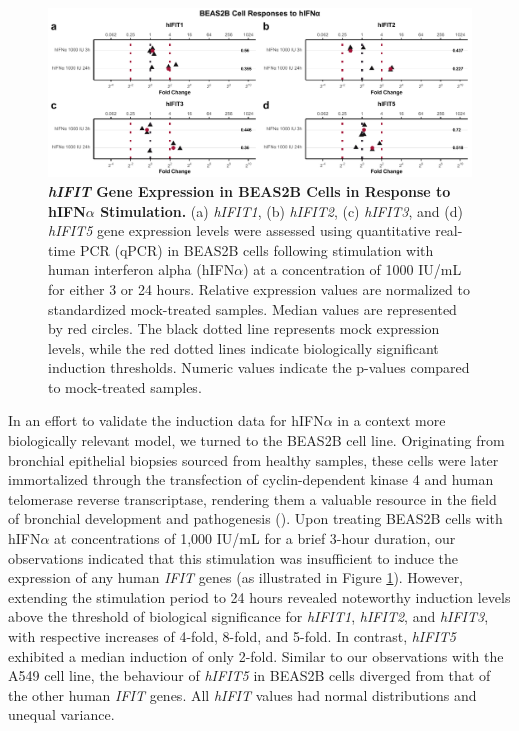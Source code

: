 \begin{figure}
    \centering
    \includegraphics[width=1\linewidth]{06. Chapter 1/Figs/01. Induction/05. beas2b_ifna.pdf}
    \caption[\textit{hIFIT} Gene Expression in BEAS2B Cells in Response to hIFN\(\alpha\) Stimulation.]{\textbf{\textit{hIFIT} Gene Expression in BEAS2B Cells in Response to hIFN\(\alpha\) Stimulation.} (a) \textit{hIFIT1}, (b) \textit{hIFIT2}, (c) \textit{hIFIT3}, and (d) \textit{hIFIT5} gene expression levels were assessed using quantitative real-time PCR (qPCR) in BEAS2B cells following stimulation with human interferon alpha (hIFN\(\alpha\)) at a concentration of 1000 IU/mL for either 3 or 24 hours. Relative expression values are normalized to standardized mock-treated samples. Median values are represented by red circles. The black dotted line represents mock expression levels, while the red dotted lines indicate biologically significant induction thresholds. Numeric values indicate the p-values compared to mock-treated samples.}
    \label{fig:BEAS2B responses to hIFNa}
\end{figure}

In an effort to validate the induction data for hIFN\(\alpha\) in a context more biologically relevant model, we turned to the BEAS2B cell line. Originating from bronchial epithelial biopsies sourced from healthy samples, these cells were later immortalized through the transfection of cyclin-dependent kinase 4 and human telomerase reverse transcriptase, rendering them a valuable resource in the field of bronchial development and pathogenesis (\cite{Ramirez2004ImmortalizationOncoproteins}). Upon treating BEAS2B cells with hIFN\(\alpha\) at concentrations of 1,000 IU/mL for a brief 3-hour duration, our observations indicated that this stimulation was insufficient to induce the expression of any human \textit{IFIT} genes (as illustrated in Figure \ref{fig:BEAS2B responses to hIFNa}). However, extending the stimulation period to 24 hours revealed noteworthy induction levels above the threshold of biological significance for \textit{hIFIT1}, \textit{hIFIT2}, and \textit{hIFIT3}, with respective increases of 4-fold, 8-fold, and 5-fold. In contrast, \textit{hIFIT5} exhibited a median induction of only 2-fold. Similar to our observations with the A549 cell line, the behaviour of \textit{hIFIT5} in BEAS2B cells diverged from that of the other human \textit{IFIT} genes. All \textit{hIFIT} values had normal distributions and unequal variance.

